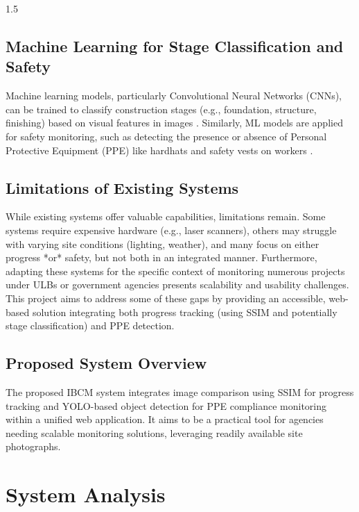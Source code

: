 \documentclass[12pt,a4paper]{report}
\begin{document}
\begin{spacing}{1.5}
    \section{Machine Learning for Stage Classification and Safety}
    Machine learning models, particularly Convolutional Neural Networks (CNNs), can be trained to classify construction stages (e.g., foundation, structure, finishing) based on visual features in images \cite{CNN_Construction}. Similarly, ML models are applied for safety monitoring, such as detecting the presence or absence of Personal Protective Equipment (PPE) like hardhats and safety vests on workers \cite{PPE_Detection}.

    \section{Limitations of Existing Systems}
    While existing systems offer valuable capabilities, limitations remain. Some systems require expensive hardware (e.g., laser scanners), others may struggle with varying site conditions (lighting, weather), and many focus on either progress *or* safety, but not both in an integrated manner. Furthermore, adapting these systems for the specific context of monitoring numerous projects under ULBs or government agencies presents scalability and usability challenges. This project aims to address some of these gaps by providing an accessible, web-based solution integrating both progress tracking (using SSIM and potentially stage classification) and PPE detection.

    \section{Proposed System Overview}
    The proposed IBCM system integrates image comparison using SSIM for progress tracking and YOLO-based object detection for PPE compliance monitoring within a unified web application. It aims to be a practical tool for agencies needing scalable monitoring solutions, leveraging readily available site photographs.

    \chapter{System Analysis}
    \label{chap:system_analysis}


\end{spacing}
\end{document}
